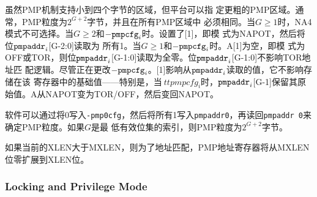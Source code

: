 {\iffalse
Although the PMP mechanism supports regions as small as four bytes, platforms
may specify coarser PMP regions. In general, the PMP grain is $2^{G+2}$ bytes
and must be the same across all PMP regions.  When $G \geq 1$, the NA4 mode
is not selectable.  When $G \geq 2$ and ${\tt pmpcfg}_i$.A[1] is set, i.e.
the mode is NAPOT, then bits ${\tt pmpaddr}_i$[G-2:0] read as all ones.  When
$G \geq 1$ and ${\tt pmpcfg}_i$.A[1] is clear, i.e. the mode is OFF or TOR,
then bits ${\tt pmpaddr}_i$[G-1:0] read as all zeros.  Bits ${\tt
pmpaddr}_i$[G-1:0] do not affect the TOR address-matching logic.
Although changing ${\tt pmpcfg}_i$.A[1] affects the value read from
${\tt pmpaddr}_i$, it does not affect the underlying value stored in that
register---in particular, ${\tt pmpaddr}_i$[G-1] retains its original value
when ${\tt pmpcfg}_i$.A is changed from NAPOT to TOR/OFF then back to NAPOT.
\fi
虽然PMP机制支持小到四个字节的区域，但平台可以指
定更粗的PMP区域。通常，PMP粒度为$2^{G+2}$字节，并且在所有PMP区域中
必须相同。当$G\geq 1$时，NA4模式不可选择。当$G\geq 2$和${\tt-pmpcfg}_i$时。设置了[1]，即模
式为NAPOT，然后将位${\tt pmpaddr}_i$[G-2:0]读取为
所有1。当$G\geq 1$和${\tt-pmpcfg}_i$时。A[1]为空，即模
式为OFF或TOR，则位${\tt pmpaddr}_i$[G-1:0]读取为全零。位${\tt pmpaddr}_i$[G-1:0]不影响TOR地址匹
配逻辑。尽管正在更改${\tt-pmpcfg}_i$。[1]影响从${\tt pmpaddr}_i$读取的值，它不影响存储在该
寄存器中的基础值——特别是，当${\ tt pmpcfg}_i$时，${\tt pmpaddr}_i$[G-1]保留其原
始值。A从NAPOT变为TOR/OFF，然后变回NAPOT。

\iffalse
\begin{commentary}
Software may determine the PMP granularity by writing zero to {\tt pmp0cfg},
then writing all ones to {\tt pmpaddr0}, then reading back {\tt pmpaddr0}.
If $G$ is the index of the least-significant bit set,
the PMP granularity is $2^{G+2}$ bytes.
\end{commentary}
\fi
\begin{commentary}
软件可以通过将0写入{\tt-pmp0cfg}，然后将所有1写入{\tt pmpaddr0}，再读回{\tt pmpaddr 0}来确定PMP粒度。如果$G$是最
低有效位集的索引，则PMP粒度为$2^{G+2}$字节。
\end{commentary}

\iffalse
If the current XLEN is greater than MXLEN, the PMP address registers are
zero-extended from MXLEN to XLEN bits for the purposes of address matching.
\fi
如果当前的XLEN大于MXLEN，则为了地址匹配，PMP地址寄存器将从MXLEN位零扩展到XLEN位。

\subsubsection*{Locking and Privilege Mode}

}

